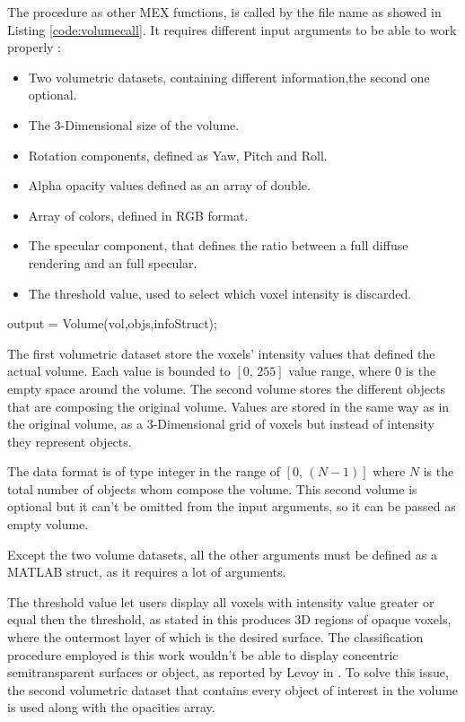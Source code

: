 \documentclass[12pt,a4paper]{extarticle}
\newcommand{\linespace}{\vspace{8pt}}
\begin{document}
The procedure as other MEX functions, is called by the file name as showed in Listing \ref{code:volumecall}. It requires different input arguments to be able to work properly :
\begin{itemize}
\item Two volumetric datasets, containing different information,the second one optional.
\item The 3-Dimensional size of the volume.
\item Rotation components, defined as Yaw, Pitch and Roll.
\item Alpha opacity values defined as an array of double.
\item Array of colors, defined in RGB format.
\item The specular component, that defines the ratio between a full diffuse rendering and an full specular. 
\item The threshold value, used to select which voxel intensity is discarded.
\end{itemize}

\begin{cpp}[caption={Volume rendering MEX function call with left and right arguments, respectively output and input arguments},label=code:volumecall]
output = Volume(vol,objs,infoStruct);
\end{cpp}

The first volumetric dataset store the voxels' intensity values that defined the actual volume. Each value is bounded to $[0,\,255]$ value range, where $0$ is the empty space around the volume. The second volume stores the different objects that are composing the original volume. Values are stored in the same way as in the original volume, as a 3-Dimensional grid of voxels but instead of intensity they represent objects. 

The data format is of type integer in the range of $[0,\,(N-1)]$ where $N$ is the total number of objects whom compose the volume. This second volume is optional but it can't be omitted from the input arguments, so it can be passed as empty volume.

Except the two volume datasets, all the other arguments must be defined as a MATLAB struct, as it requires a lot of arguments.
\linespace

The threshold value let users display all voxels with intensity value greater or equal then the threshold, as stated in \cite{levoy_1988:4} this produces 3D regions of opaque voxels, where the outermost layer of which is the desired surface.
The classification procedure employed is this work wouldn't be able to display concentric semitransparent surfaces or object, as reported by Levoy in \cite{levoy_1988:4}. To solve this issue, the second volumetric dataset that contains every object of interest in the volume is used along with the opacities array.
\linespace
\end{document}
